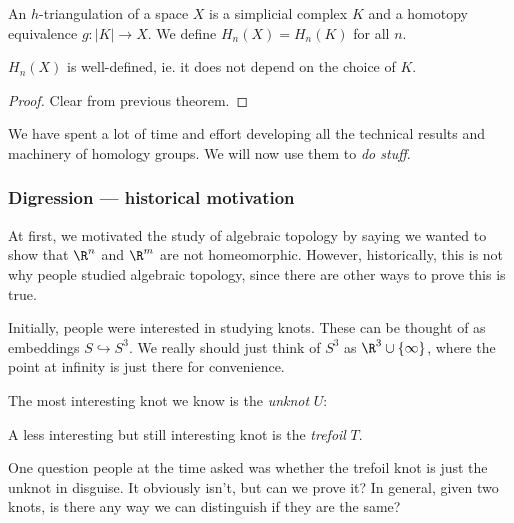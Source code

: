 \documentclass[a4paper]{article}
\begin{document}
\begin{defi}
  An $h$-triangulation of a space $X$ is a simplicial complex $K$ and a homotopy equivalence $g: |K| \to X$. We define $H_n(X) = H_n(K)$ for all $n$.
\end{defi}

\begin{lemma}
  $H_n(X)$ is well-defined, ie. it does not depend on the choice of $K$.
\end{lemma}

\begin{proof}
  Clear from previous theorem.
\end{proof}

We have spent a lot of time and effort developing all the technical results and machinery of homology groups. We will now use them to \emph{do stuff}.

\subsubsection*{Digression --- historical motivation}
At first, we motivated the study of algebraic topology by saying we wanted to show that $\R^n$ and $\R^m$ are not homeomorphic. However, historically, this is not why people studied algebraic topology, since there are other ways to prove this is true.

Initially, people were interested in studying knots. These can be thought of as embeddings $S \hookrightarrow S^3$. We really should just think of $S^3$ as $\R^3 \cup \{\infty\}$, where the point at infinity is just there for convenience.

The most interesting knot we know is the \emph{unknot} $U$:
\begin{center}
\end{center}
A less interesting but still interesting knot is the \emph{trefoil} $T$.
\begin{center}
\end{center}
One question people at the time asked was whether the trefoil knot is just the unknot in disguise. It obviously isn't, but can we prove it? In general, given two knots, is there any way we can distinguish if they are the same?
\end{document}
